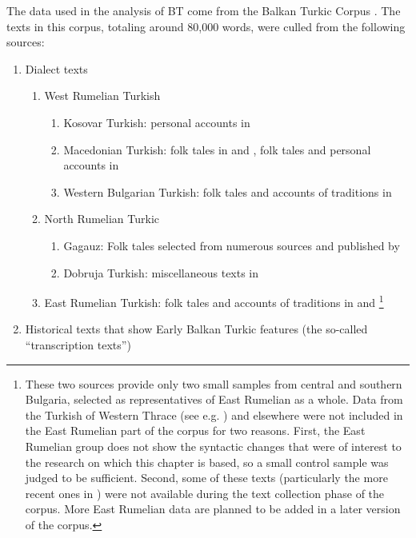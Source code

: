 \documentclass[output=paper,colorlinks,citecolor=brown]{langscibook}
\begin{document}
The data used in the analysis of BT come from the Balkan Turkic Corpus \citep{Keskin.BTC}. The texts in this corpus, totaling around 80,000 words, were culled from the following sources:

\begin{enumerate}\sloppy
    \item Dialect texts
    \begin{enumerate}
        \item West Rumelian Turkish
        \begin{enumerate}
            \item Kosovar Turkish: personal accounts in \citet{Sulcevsi.2019}
            \item Macedonian Turkish: folk tales in \citet{Destanov.2016} and \citet{Kakuk.1972}, folk tales and personal accounts in \citet{Katona.1969}
            \item Western Bulgarian Turkish: folk tales and accounts of traditions in \citet{Kakuk.1961.KM,Kakuk.1961.K}
        \end{enumerate}
        \item North Rumelian Turkic
        \begin{enumerate}
            \item Gagauz: Folk tales selected from numerous sources and published by \citet{Ozkan.2007}
            \item Dobruja Turkish: miscellaneous texts in \citet{Haliloglu.2017}
        \end{enumerate}
        \item East Rumelian Turkish: folk tales and accounts of traditions in \citet{Hazai.1960} and \citet{Kakuk.1958}\footnote{These two sources provide only two small samples from central and southern Bulgaria, selected as representatives of East Rumelian as a whole. Data from the Turkish of Western Thrace (see e.g. \citealt{Petrou.Westthrakien}) and elsewhere were not included in the East Rumelian part of the corpus for two reasons. First, the East Rumelian group does not show the syntactic changes that were of interest to the research on which this chapter is based, so a small control sample was judged to be sufficient. Second, some of these texts (particularly the more recent ones in \citealt{Petrou.Westthrakien}) were not available during the text collection phase of the corpus. More East Rumelian data are planned to be added in a later version of the corpus.}
    \end{enumerate}
    \item Historical texts that show Early Balkan Turkic features (the so-called “transcription texts”)

\end{enumerate}
\end{document}
